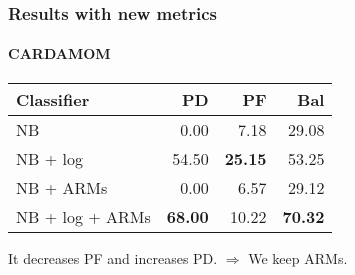 \begin{frame}
 \frametitle{Results with new metrics}
 \framesubtitle{CARDAMOM}
 \begin{center}
 \begin{tabular}{lrrr}
  \hspace{0.2cm} Classifier & PD & PF & Bal\\
  \hline
  NB & 0.00 & 7.18 & 29.08\\
  NB + log & 54.50 & \textbf{25.15} & 53.25\\
  NB + ARMs & 0.00 & 6.57 & 29.12\\
  NB + log + ARMs & \textbf{68.00} & 10.22 & \textbf{70.32}\\
  \hline
 \end{tabular}
 \end{center}
 \vspace{0.5cm}
 It decreases PF and increases PD. $\Longrightarrow$ \alert{We keep ARMs.}
\end{frame}
